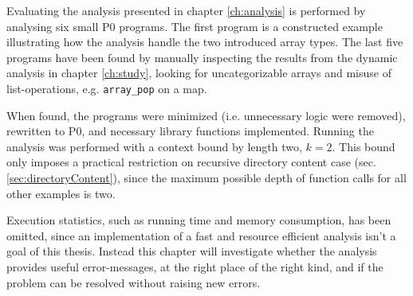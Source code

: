 
Evaluating the analysis presented in chapter \ref{ch:analysis} is performed by analysing six small P0 programs. The first program is a constructed example illustrating how the analysis handle the two introduced array types. The last five programs have been found by manually inspecting the results from the dynamic analysis in chapter \ref{ch:study}, looking for uncategorizable arrays and misuse of list-operations, e.g. \texttt{array\_pop} on a map. 


When found, the programs were minimized (i.e. unnecessary logic were removed), rewritten to P0, and necessary library functions implemented. Running the analysis was performed with a context bound by length two, $k=2$. This bound only imposes a practical restriction on recursive directory content case (sec. \ref{sec:directoryContent}), since the maximum possible depth of function calls for all other examples is two. 

Execution statistics, such as running time and memory consumption, has been omitted, since an implementation of a fast and resource efficient analysis isn't a goal of this thesis. Instead this chapter will investigate whether the analysis provides useful error-messages, at the right place of the right kind, and if the problem can be resolved without raising new errors.



